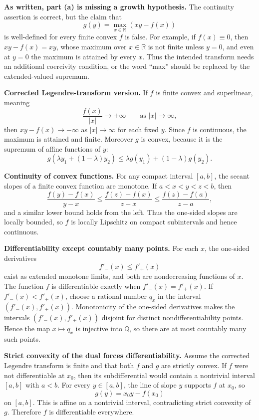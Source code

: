 \begin{solution}
\textbf{As written, part (a) is missing a growth hypothesis.}
The continuity assertion is correct, but the claim that
\[
g(y)=\max_{x\in\mathbb R}(xy-f(x))
\]
is well-defined for every finite convex \(f\) is false. For example, if \(f(x)\equiv0\), then \(xy-f(x)=xy\), whose maximum over \(x\in\mathbb R\) is not finite unless \(y=0\), and even at \(y=0\) the maximum is attained by every \(x\). Thus the intended transform needs an additional coercivity condition, or the word ``max'' should be replaced by the extended-valued supremum.

\textbf{Corrected Legendre-transform version.}
If \(f\) is finite convex and superlinear, meaning
\[
\frac{f(x)}{|x|}\to+\infty
\qquad \text{as } |x|\to\infty,
\]
then \(xy-f(x)\to-\infty\) as \(|x|\to\infty\) for each fixed \(y\). Since \(f\) is continuous, the maximum is attained and finite. Moreover \(g\) is convex, because it is the supremum of affine functions of \(y\):
\[
g(\lambda y_1+(1-\lambda)y_2)
\leq \lambda g(y_1)+(1-\lambda)g(y_2).
\]

\textbf{Continuity of convex functions.}
For any compact interval \([a,b]\), the secant slopes of a finite convex function are monotone. If \(a<x<y<z<b\), then
\[
\frac{f(y)-f(x)}{y-x}
\leq
\frac{f(z)-f(x)}{z-x}
\leq
\frac{f(z)-f(a)}{z-a},
\]
and a similar lower bound holds from the left. Thus the one-sided slopes are locally bounded, so \(f\) is locally Lipschitz on compact subintervals and hence continuous.

\textbf{Differentiability except countably many points.}
For each \(x\), the one-sided derivatives
\[
f'_-(x)\leq f'_+(x)
\]
exist as extended monotone limits, and both are nondecreasing functions of \(x\). The function \(f\) is differentiable exactly when \(f'_-(x)=f'_+(x)\). If \(f'_-(x)<f'_+(x)\), choose a rational number \(q_x\) in the interval \((f'_-(x),f'_+(x))\). Monotonicity of the one-sided derivatives makes the intervals \((f'_-(x),f'_+(x))\) disjoint for distinct nondifferentiability points. Hence the map \(x\mapsto q_x\) is injective into \(\mathbb Q\), so there are at most countably many such points.

\textbf{Strict convexity of the dual forces differentiability.}
Assume the corrected Legendre transform is finite and that both \(f\) and \(g\) are strictly convex. If \(f\) were not differentiable at \(x_0\), then its subdifferential would contain a nontrivial interval \([a,b]\) with \(a<b\). For every \(y\in[a,b]\), the line of slope \(y\) supports \(f\) at \(x_0\), so
\[
g(y)=x_0y-f(x_0)
\]
on \([a,b]\). This is affine on a nontrivial interval, contradicting strict convexity of \(g\). Therefore \(f\) is differentiable everywhere.
\end{solution}
